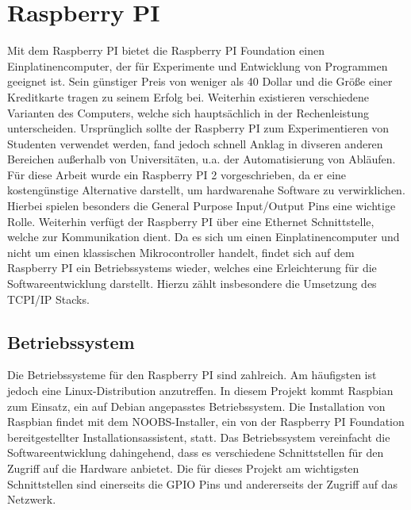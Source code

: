 \chapter{Raspberry PI}
Mit dem Raspberry PI bietet die Raspberry PI Foundation einen Einplatinencomputer, der für Experimente und Entwicklung von Programmen geeignet ist. Sein günstiger Preis von weniger als 40 Dollar und die Größe einer Kreditkarte tragen zu seinem Erfolg bei. Weiterhin existieren verschiedene Varianten des Computers, welche sich hauptsächlich in der Rechenleistung unterscheiden. Ursprünglich sollte der Raspberry PI zum Experimentieren von Studenten verwendet werden, fand jedoch schnell Anklag in divseren anderen Bereichen außerhalb von Universitäten, u.a. der Automatisierung von Abläufen.\\ %
Für diese Arbeit wurde ein Raspberry PI 2 vorgeschrieben, da er eine kostengünstige Alternative darstellt, um hardwarenahe Software zu verwirklichen. Hierbei spielen besonders die General Purpose Input/Output Pins eine wichtige Rolle. Weiterhin verfügt der Raspberry PI über eine Ethernet Schnittstelle, welche zur Kommunikation dient. Da es sich um einen Einplatinencomputer und nicht um einen klassischen Mikrocontroller handelt, findet sich auf dem Raspberry PI ein Betriebssystems wieder, welches eine Erleichterung für die Softwareentwicklung darstellt. Hierzu zählt insbesondere die Umsetzung des TCPI/IP Stacks.\\ %

\section{Betriebssystem}
Die Betriebssysteme für den Raspberry PI sind zahlreich. Am häufigsten ist jedoch eine Linux-Distribution anzutreffen. In diesem Projekt kommt Raspbian zum Einsatz, ein auf Debian angepasstes Betriebssystem. Die Installation von Raspbian findet mit dem NOOBS-Installer, ein von der Raspberry PI Foundation bereitgestellter Installationsassistent, statt. %
Das Betriebssystem vereinfacht die Softwareentwicklung dahingehend, dass es verschiedene Schnittstellen für den Zugriff auf die Hardware anbietet. Die für dieses Projekt am wichtigsten Schnittstellen sind einerseits die GPIO Pins und andererseits der Zugriff auf das Netzwerk.

